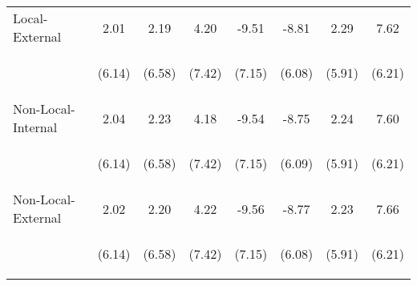\begin{center}
\begin{tabular}{lccccccc}
Local-External & 2.01 & 2.19 & 4.20 & -9.51 & -8.81 & 2.29 & 7.62 \\
\vspace{4pt} & \begin{footnotesize}(6.14)\end{footnotesize} & \begin{footnotesize}(6.58)\end{footnotesize} & \begin{footnotesize}(7.42)\end{footnotesize} & \begin{footnotesize}(7.15)\end{footnotesize} & \begin{footnotesize}(6.08)\end{footnotesize} & \begin{footnotesize}(5.91)\end{footnotesize} & \begin{footnotesize}(6.21)\end{footnotesize} \\
Non-Local-Internal & 2.04 & 2.23 & 4.18 & -9.54 & -8.75 & 2.24 & 7.60 \\
\vspace{4pt} & \begin{footnotesize}(6.14)\end{footnotesize} & \begin{footnotesize}(6.58)\end{footnotesize} & \begin{footnotesize}(7.42)\end{footnotesize} & \begin{footnotesize}(7.15)\end{footnotesize} & \begin{footnotesize}(6.09)\end{footnotesize} & \begin{footnotesize}(5.91)\end{footnotesize} & \begin{footnotesize}(6.21)\end{footnotesize} \\
Non-Local-External & 2.02 & 2.20 & 4.22 & -9.56 & -8.77 & 2.23 & 7.66 \\
\vspace{4pt} & \begin{footnotesize}(6.14)\end{footnotesize} & \begin{footnotesize}(6.58)\end{footnotesize} & \begin{footnotesize}(7.42)\end{footnotesize} & \begin{footnotesize}(7.15)\end{footnotesize} & \begin{footnotesize}(6.08)\end{footnotesize} & \begin{footnotesize}(5.91)\end{footnotesize} & \begin{footnotesize}(6.21)\end{footnotesize} \\

\end{tabular}
\end{center}
